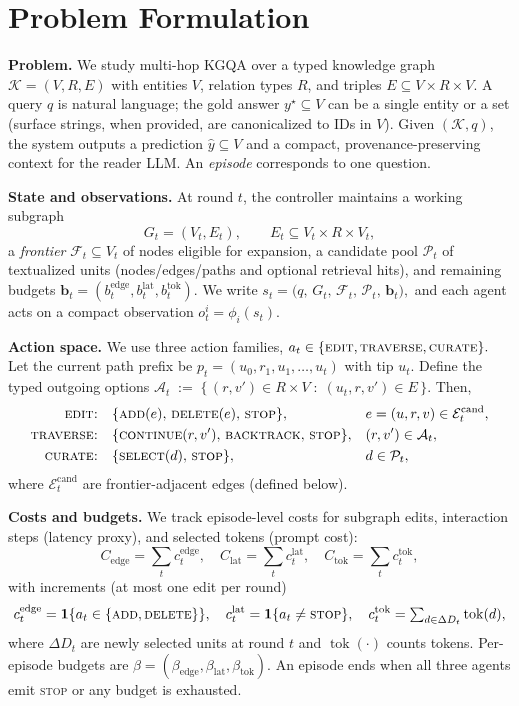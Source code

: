 \documentclass{article} %
\begin{document}
\section{Problem Formulation}
\label{sec:problem}

\textbf{Problem.}
We study multi-hop KGQA over a typed knowledge graph
\(\mathcal{K}=(V,R,E)\) with entities \(V\), relation types \(R\), and
triples \(E\subseteq V\times R\times V\).
A query \(q\) is natural language; the gold answer \(y^\star\subseteq V\)
can be a single entity or a set (surface strings, when provided, are canonicalized to IDs in \(V\)).
Given \((\mathcal{K},q)\), the system outputs a prediction \(\hat y\subseteq V\)
and a compact, provenance-preserving context for the reader LLM.
An \emph{episode} corresponds to one question.

\textbf{State and observations.}
At round \(t\), the controller maintains a working subgraph
\[
G_t=(V_t,E_t),\qquad E_t \subseteq V_t \times R \times V_t,
\]
a \emph{frontier} \(\mathcal{F}_t\subseteq V_t\) of nodes eligible for expansion,
a candidate pool \(\mathcal{P}_t\) of textualized units (nodes/edges/paths and optional retrieval hits),
and remaining budgets \(\mathbf{b}_t=(b^{\text{edge}}_t,b^{\text{lat}}_t,b^{\text{tok}}_t)\).
We write
$
s_t=\big(q,\,G_t,\,\mathcal{F}_t,\,\mathcal{P}_t,\,\mathbf{b}_t\big),
$
and each agent acts on a compact observation \(o^i_t=\phi_i(s_t)\).

\textbf{Action space.}
We use three action families,
$
a_t\in\{\textsc{edit},\textsc{traverse},\textsc{curate}\}.
$
Let the current path prefix be \(p_t=(u_0,r_1,u_1,\dots,u_t)\) with tip \(u_t\).
Define the typed outgoing options
$
\mathcal{A}_t \;:=\; \{\, (r,v') \in R\times V \;:\; (u_t,r,v') \in E \,\}.
$
Then,
\[
\begin{aligned}
\textsc{edit:}&\quad \{\textsc{add}(e),\,\textsc{delete}(e),\,\textsc{stop}\},
&& e=(u,r,v)\in \mathcal{E}^{\mathrm{cand}}_t,\\
\textsc{traverse:}&\quad \{\textsc{continue}(r,v'),\,\textsc{backtrack},\,\textsc{stop}\},
&& (r,v')\in\mathcal{A}_t,\\
\textsc{curate:}&\quad \{\textsc{select}(d),\,\textsc{stop}\},
&& d\in\mathcal{P}_t,
\end{aligned}
\]
where \(\mathcal{E}^{\mathrm{cand}}_t\) are frontier-adjacent edges (defined below).

\textbf{Costs and budgets.}
We track episode-level costs for subgraph edits, interaction steps (latency proxy),
and selected tokens (prompt cost):
\[
C_{\text{edge}}=\sum_t c^{\text{edge}}_t,\quad
C_{\text{lat}}=\sum_t c^{\text{lat}}_t,\quad
C_{\text{tok}}=\sum_t c^{\text{tok}}_t,
\]
with increments (at most one edit per round)
\[
c^{\text{edge}}_t=\mathbf{1}\{a_t\in\{\textsc{add},\textsc{delete}\}\},\quad
c^{\text{lat}}_t=\mathbf{1}\{a_t\neq\textsc{stop}\},\quad
c^{\text{tok}}_t=\textstyle\sum_{d\in\Delta D_t}\operatorname{tok}(d),
\]
where \(\Delta D_t\) are newly selected units at round \(t\) and \(\operatorname{tok}(\cdot)\) counts tokens.
Per-episode budgets are \(\beta=(\beta_{\text{edge}},\beta_{\text{lat}},\beta_{\text{tok}})\).
An episode ends when all three agents emit \textsc{stop} or any budget is exhausted.
\end{document}

